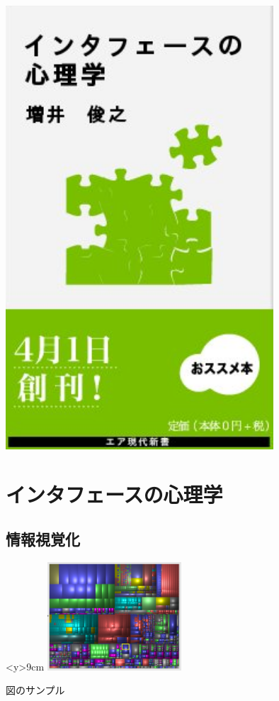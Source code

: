 \documentclass[a5j,openany,papersize,oneside]{tbook}
\begin{document}
\includegraphics[width=10cm,angle=90,bb=0 0 233 386]{0ace712fba59ecc60fc38d1c93633f6d.png}

\frontmatter
\tableofcontents

\mainmatter

\chapter{インタフェースの心理学}

\section{情報視覚化}


\begin{floatingfigure}[r]{60mm}
  \begin{minipage}<y>{9cm}
    \flushright
    \includegraphics[width=5cm,bb=0 0 421 340]{b8023bc4426a31f2b45e07708d93378e.png}
    \par
    図のサンプル \hfill
  \end{minipage}
\end{floatingfigure}
\end{document}
